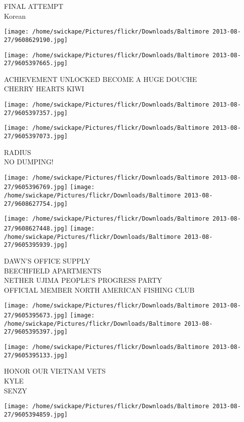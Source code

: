 \documentclass[10pt,letterpaper]{article}
\begin{document}
FINAL ATTEMPT\\
Korean
\pagebreak

\texttt{[image: /home/swickape/Pictures/flickr/Downloads/Baltimore 2013-08-27/9608629190.jpg]}

\vspace{0.25in}
\texttt{[image: /home/swickape/Pictures/flickr/Downloads/Baltimore 2013-08-27/9605397665.jpg]}

ACHIEVEMENT UNLOCKED BECOME A HUGE DOUCHE\\
CHERRY HEARTS KIWI
\pagebreak

\texttt{[image: /home/swickape/Pictures/flickr/Downloads/Baltimore 2013-08-27/9605397357.jpg]}

\vspace{0.25in}
\texttt{[image: /home/swickape/Pictures/flickr/Downloads/Baltimore 2013-08-27/9605397073.jpg]}

RADIUS\\
NO DUMPING!
\pagebreak

\texttt{[image: /home/swickape/Pictures/flickr/Downloads/Baltimore 2013-08-27/9605396769.jpg]}
\texttt{[image: /home/swickape/Pictures/flickr/Downloads/Baltimore 2013-08-27/9608627754.jpg]}

\texttt{[image: /home/swickape/Pictures/flickr/Downloads/Baltimore 2013-08-27/9608627448.jpg]}
\texttt{[image: /home/swickape/Pictures/flickr/Downloads/Baltimore 2013-08-27/9605395939.jpg]}

DAWN'S OFFICE SUPPLY\\
BEECHFIELD APARTMENTS\\
NETHER UJIMA PEOPLE'S PROGRESS PARTY\\
OFFICIAL MEMBER NORTH AMERICAN FISHING CLUB
\pagebreak

\texttt{[image: /home/swickape/Pictures/flickr/Downloads/Baltimore 2013-08-27/9605395673.jpg]}
\texttt{[image: /home/swickape/Pictures/flickr/Downloads/Baltimore 2013-08-27/9605395397.jpg]}

\vspace{0.25in}
\texttt{[image: /home/swickape/Pictures/flickr/Downloads/Baltimore 2013-08-27/9605395133.jpg]}

HONOR OUR VIETNAM VETS\\
KYLE\\
SENZY
\pagebreak

\texttt{[image: /home/swickape/Pictures/flickr/Downloads/Baltimore 2013-08-27/9605394859.jpg]}
\end{document}
